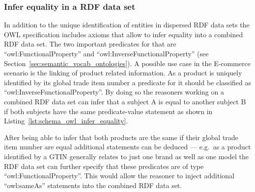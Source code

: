\subsubsection{Infer equality in a \gls{RDF} data set}
\label{subsub:info_unique_infer}

In addition to the unique identification of entities in dispersed \gls{RDF} data sets the \gls{OWL} specification includes axioms that allow to infer equality into a combined \gls{RDF} data set. The two important predicates for that are ``owl:FunctionalProperty'' and ``owl:InverseFunctionalProperty'' (see Section~\ref{sec:semantic_vocab_ontologies}). A possible use case in the \gls{E-commerce} scenario is the linking of product related information. As a product is uniquely identified by its global trade item number a predicate for it should be classified as ``owl:InverseFunctionalProperty''. By doing so the reasoners working on a combined \gls{RDF} data set can infer that a subject A is equal to another subject B if both subjects have the same predicate-value statement as shown in Listing~\ref{lst:schema_owl_infer_equality}. \@


After being able to infer that both products are the same if their global trade item number are equal additional statements can be deduced --- e.g.\ as a product identified by a \gls{GTIN} generally relates to just one brand as well as one model the \gls{RDF} data set can further specify that these predicates are of type ``owl:FunctionalProperty''. This would allow the reasoner to inject additional ``owl:sameAs'' statements into the combined \gls{RDF} data set.


